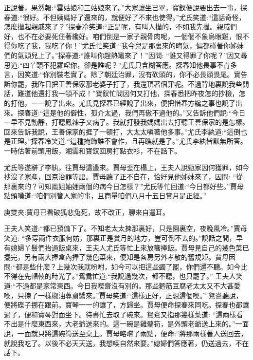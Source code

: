 \begin{parag}
    正說著，果然報:“雲姑娘和三姑娘來了。”大家讓坐已畢，寶釵便說要出去一事，探春道:“很好。不但姨媽好了還來的，就便好了不來也使得。”尤氏笑道:“這話奇怪，怎麼攆起親戚來了？”探春冷笑道:“正是呢，有叫人攆的，不如我先攆。親戚們好，也不在必要死住著纔好。咱們倒是一家子親骨肉呢，一個個不象烏眼雞，恨不得你吃了我，我吃了你！”尤氏忙笑道:“我今兒是那裏來的晦氣，偏都碰著你姊妹們的氣頭兒上了。”探春道:“誰叫你趕熱竈來了！”因問: “誰又得罪了你呢？”因又尋思道:“四丫頭不犯羅唣你，卻是誰呢？”尤氏只含糊答應。探春知他畏事不肯多言，因笑道:“你別裝老實了。除了朝廷治罪，沒有砍頭的，你不必畏頭畏尾。實告訴你罷，我昨日把王善保家那老婆子打了，我還頂著個罪呢。不過背地裏說我些閒話，難道他還打我一頓不成！”寶釵忙問因何又打他，探春悉把昨夜怎的抄檢，怎的打他，一一說了出來。尤氏見探春已經說了出來，便把惜春方纔之事也說了出來。探春道:“這是他的僻性，孤介太過，我們再傲不過他的。”又告訴他們說:“今日一早不見動靜，打聽鳳辣子又病了。我就打發我媽媽出去打聽王善保家的是怎樣。回來告訴我說，王善保家的捱了一頓打，大太太嗔著他多事。”尤氏李紈道:“這倒也是正理。”探春冷笑道:“這種掩飾誰不會作，且再瞧就是了。”尤氏李紈皆默無所答。一時估著前頭用飯，湘雲和寶釵回房打點衣衫，不在話下。
\end{parag}


\begin{parag}
    尤氏等遂辭了李紈，往賈母這邊來。賈母歪在榻上，王夫人說甄家因何獲罪，如今抄沒了家產，回京治罪等語。賈母聽了正不自在，恰好見他姊妹來了，因問: “從那裏來的？可知鳳姐妯娌兩個的病今日怎樣？”尤氏等忙回道:“今日都好些。”賈母點頭嘆道:“咱們別管人家的事，且商量咱們八月十五日賞月是正經。”\begin{note}庚雙夾:賈母已看破狐悲兔死，故不改正，聊來自遣耳。\end{note}王夫人笑道:“都已預備下了。不知老太太揀那裏好，只是園裏空，夜晚風冷。”賈母笑道: “多穿兩件衣服何妨，那裏正是賞月的地方，豈可倒不去的。”說話之間，早有媳婦丫鬟們抬過飯桌來，王夫人尤氏等忙上來放箸捧飯。賈母見自己的幾色菜已擺完，另有兩大捧盒內捧了幾色菜來，便知是各房另外孝敬的舊規矩。賈母因問:“都是些什麼？上幾次我就吩咐，如今可以把這些蠲了罷，你們還不聽。如今比不得在先輻輳的時光了。”鴛鴦忙道:“我說過幾次，都不聽，也只罷了。” 王夫人笑道:“不過都是家常東西。今日我喫齋沒有別的。那些麪筋豆腐老太太又不大甚愛喫，只揀了一樣椒油蓴齏醬來。”賈母笑道:“這樣正好，正想這個喫。” 鴛鴦聽說，便將碟子挪在跟前。寶琴一一的讓了，方歸坐。賈母便命探春來同吃。探春也都讓過了，便和寶琴對面坐下。待書忙去取了碗來。鴛鴦又指那幾樣菜道: “這兩樣看不出是什麼東西來，大老爺送來的。這一碗是雞髓筍，是外頭老爺送上來的。”一面說，一面就只將這碗筍送至桌上。賈母略嚐了兩點，便命:“將那兩樣著人送回去，就說我吃了。以後不必天天送，我想喫自然來要。”媳婦們答應著，仍送過去，不在話下。
\end{parag}


